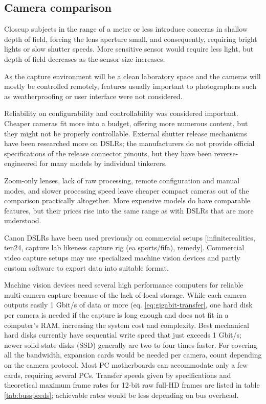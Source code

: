 

\subsection{Camera comparison} \label{sec:cameracomparison} %

Closeup subjects in the range of a metre or less introduce concerns in shallow depth of field, forcing the lens aperture small, and consequently, requiring bright lights or slow shutter speeds.
More sensitive sensor would require less light, but depth of field decreases as the sensor size increases.

As the capture environment will be a clean laboratory space and the cameras will mostly be controlled remotely, features usually important to photographers such as weatherproofing or user interface were not considered.


Reliability on configurability and controllability was considered important.
Cheaper cameras fit more into a budget, offering more numerous content, but they might not be properly controllable.
External shutter release mechanisms have been researched more on DSLRs;
the manufacturers do not provide official specifications of the release connector pinouts, but they have been reverse-engineered for many models by individual tinkerers.

Zoom-only lenses, lack of raw processing, remote configuration and manual modes, and slower processing speed leave cheaper compact cameras out of the comparison practically altogether.
More expensive models do have comparable features, but their prices rise into the same range as with DSLRs that are more understood.

Canon DSLRs have been used previously on commercial setups [infiniterealities, ten24, capture lab likeness capture rig (ea sports/fifa), remedy].
Commercial video capture setups may use specialized machine vision devices and partly custom software to export data into suitable format.

Machine vision devices need several high performance computers for reliable multi-camera capture because of the lack of local storage.
While each camera outputs easily 1 Gbit/s of data or more (eq. \ref{eq:gigabit-transfer}, one hard disk per camera is needed if the capture is long enough and does not fit in a computer's RAM, increasing the system cost and complexity.
Best mechanical hard disks currently have sequential write speed that just exceeds 1 Gbit/s;
newer solid-state disks (SSD) generally are two to four times faster.
For covering all the bandwidth, expansion cards would be needed per camera, count depending on the camera protocol.
Most PC motherboards can accommodate only a few cards, requiring several PCs.
Transfer speeds given by specifications and theoretical maximum frame rates for 12-bit raw full-HD frames are listed in table \ref{tab:busspeeds}; achievable rates would be less depending on bus overhead.

